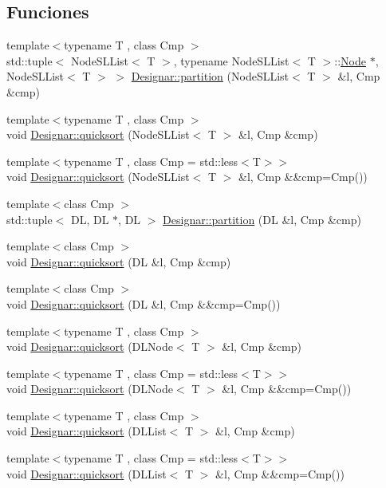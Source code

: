 \subsection*{Funciones}
\begin{DoxyCompactItemize}
\item 
{\footnotesize template$<$typename T , class Cmp $>$ }\\std\+::tuple$<$ Node\+S\+L\+List$<$ T $>$, typename Node\+S\+L\+List$<$ T $>$\+::\hyperlink{test-mtreenode_8_c_a17a24b0725f59987143c5faf63c4dc6f}{Node} $\ast$, Node\+S\+L\+List$<$ T $>$ $>$ \hyperlink{namespace_designar_acbe78eef938395624f248f069fcc3de0}{Designar\+::partition} (Node\+S\+L\+List$<$ T $>$ \&l, Cmp \&cmp)
\item 
{\footnotesize template$<$typename T , class Cmp $>$ }\\void \hyperlink{namespace_designar_a7e1e90568197223b560306a01b496969}{Designar\+::quicksort} (Node\+S\+L\+List$<$ T $>$ \&l, Cmp \&cmp)
\item 
{\footnotesize template$<$typename T , class Cmp  = std\+::less$<$\+T$>$$>$ }\\void \hyperlink{namespace_designar_a7a2c6974344050666f37a5f9cdf889a4}{Designar\+::quicksort} (Node\+S\+L\+List$<$ T $>$ \&l, Cmp \&\&cmp=Cmp())
\item 
{\footnotesize template$<$class Cmp $>$ }\\std\+::tuple$<$ DL, DL $\ast$, DL $>$ \hyperlink{namespace_designar_af9be3d9a9287bf17a54090b14c06c611}{Designar\+::partition} (DL \&l, Cmp \&cmp)
\item 
{\footnotesize template$<$class Cmp $>$ }\\void \hyperlink{namespace_designar_a8c58e24da6b5bd73a9218ece3ec9f54f}{Designar\+::quicksort} (DL \&l, Cmp \&cmp)
\item 
{\footnotesize template$<$class Cmp $>$ }\\void \hyperlink{namespace_designar_abeece6dc0f858ceaf46690f5b26b2512}{Designar\+::quicksort} (DL \&l, Cmp \&\&cmp=Cmp())
\item 
{\footnotesize template$<$typename T , class Cmp $>$ }\\void \hyperlink{namespace_designar_a5e44455a1442b74351b0fb9f9519581f}{Designar\+::quicksort} (D\+L\+Node$<$ T $>$ \&l, Cmp \&cmp)
\item 
{\footnotesize template$<$typename T , class Cmp  = std\+::less$<$\+T$>$$>$ }\\void \hyperlink{namespace_designar_a5a756296262619dd1deb6195ad0ec2a0}{Designar\+::quicksort} (D\+L\+Node$<$ T $>$ \&l, Cmp \&\&cmp=Cmp())
\item 
{\footnotesize template$<$typename T , class Cmp $>$ }\\void \hyperlink{namespace_designar_abdb3fae2c35a0696dfb66711eb224f5a}{Designar\+::quicksort} (D\+L\+List$<$ T $>$ \&l, Cmp \&cmp)
\item 
{\footnotesize template$<$typename T , class Cmp  = std\+::less$<$\+T$>$$>$ }\\void \hyperlink{namespace_designar_a199363a09da37dd34fdf7d151441fa44}{Designar\+::quicksort} (D\+L\+List$<$ T $>$ \&l, Cmp \&\&cmp=Cmp())
\end{DoxyCompactItemize}

